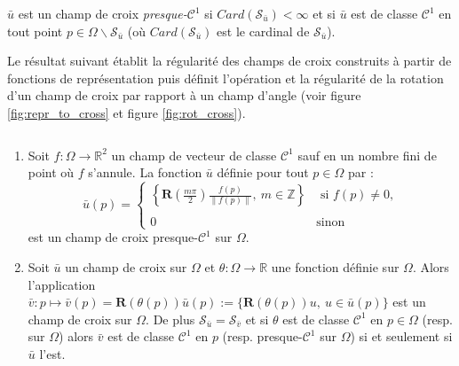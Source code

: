 \begin{definition}
\label{def:presqueC1}
    $\bar{u}$ est un champ de croix \emph{presque-$\mathcal{C}^1$} si $Card(\mathcal{S}_{\bar{u}})<\infty$ et si $\bar{u}$ est de classe $\mathcal{C}^1$ en tout point $p\in\Omega\backslash\mathcal{S}_{\bar{u}}$ (où $Card(\mathcal{S}_{\bar{u}})$ est le cardinal de $\mathcal{S}_{\bar{u}}$).
\end{definition}


Le résultat suivant établit la régularité des champs de croix construits à partir de fonctions de représentation \cite{kowalski2013pde, viertel2019approach} puis définit l'opération et la régularité de la rotation d'un champ de croix par rapport à un champ d'angle (voir figure \ref{fig:repr_to_cross} et figure \ref{fig:rot_cross}).

\begin{proposition}
\label{prop:cont1}
\[\]
\vspace{-1cm}
\begin{enumerate}
\item Soit $f : \Omega \rightarrow \mathbb{R}^2$ un champ de vecteur de classe $\mathcal{C}^1$ sauf en un nombre fini de point où $f$ s'annule. La fonction $\bar{u}$ définie pour tout $p\in\Omega$ par :
\begin{equation}
    \bar{u}(p) =
\left\{
    \begin{array}{lc}
        \displaystyle\left\{\mathbf{R}\left(\frac{m\pi}{2}\right)\frac{f(p)}{\left\|f(p)\right\|},~ m\in \mathbb{Z}\right\} &\text{ si }f(p)\neq 0,\\\\
        0& \text{sinon}
    \end{array}
\right.
\label{eq:repr_to_cross}
\end{equation}
est un champ de croix presque-$\mathcal{C}^1$ sur $\Omega$.

\item Soit $\bar{u}$ un champ de croix sur $\Omega$ et $\theta : \Omega \rightarrow \mathbb{R}$ une fonction définie sur $\Omega$. Alors l'application $\bar{v}:p\mapsto \bar{v}(p)=\mathbf{R}(\theta(p))\bar{u}(p):=\{\mathbf{R}(\theta(p)) u,~u\in \bar{u}(p)\}$ est un champ de croix sur $\Omega$. De plus $\mathcal{S}_{\bar{u}}=\mathcal{S}_{\bar{v}}$ et si $\theta$ est de classe $\mathcal{C}^1$ en $p\in\Omega$ (resp. sur $\Omega$) alors $\bar{v}$ est de classe $\mathcal{C}^1$ en $p$ (resp. presque-$\mathcal{C}^1$ sur $\Omega$) si et seulement si $\bar{u}$ l'est.
\end{enumerate}
\end{proposition}

